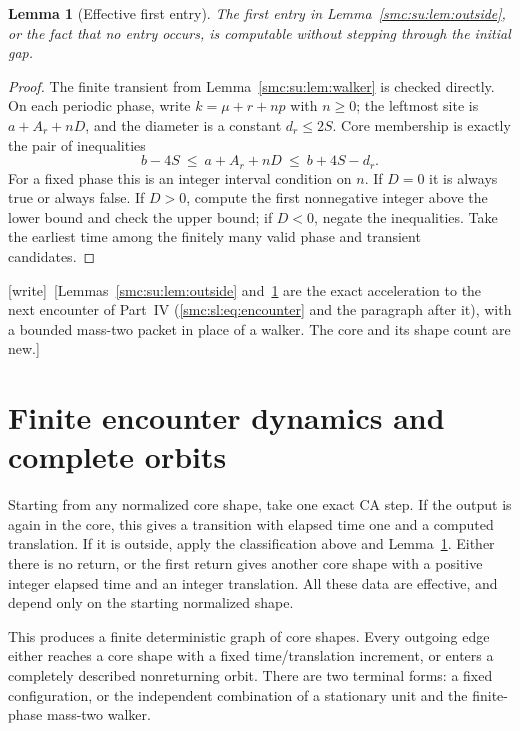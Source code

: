 \documentclass[11pt,letterpaper]{article}
\numberwithin{equation}{section}
\newtheorem{lemma}[theorem]{Lemma}
\theoremstyle{definition}
\theoremstyle{remark}
\newcommand{\wtag}{\textup{[write]}}
\begin{document}
\begin{lemma}[Effective first entry]\label{smc:su:lem:first}
The first entry in Lemma~\ref{smc:su:lem:outside}, or the fact that no entry occurs,
is computable without stepping through the initial gap.
\end{lemma}
\begin{proof}
The finite transient from Lemma~\ref{smc:su:lem:walker} is checked directly. On each
periodic phase, write $k=\mu+r+np$ with $n\ge0$; the leftmost site is
$a+A_r+nD$, and the diameter is a constant $d_r\le2S$. Core membership is
exactly the pair of inequalities
\begin{equation}
 b-4S\ \le\ a+A_r+nD\ \le\ b+4S-d_r.                 \label{smc:su:eq:hit}
\end{equation}
For a fixed phase this is an integer interval condition on $n$. If $D=0$ it is
always true or always false. If $D>0$, compute the first nonnegative integer
above the lower bound and check the upper bound; if $D<0$, negate the
inequalities. Take the earliest time among the finitely many valid phase and
transient candidates.
\end{proof}
\wtag\ [Lemmas~\ref{smc:su:lem:outside} and~\ref{smc:su:lem:first} are the exact acceleration to the next encounter of Part~IV (\eqref{smc:sl:eq:encounter} and the paragraph after it), with a bounded mass-two packet in place of a walker. The core and its shape count are new.]

\section{Finite encounter dynamics and complete orbits}\label{smc:su:sec:orbits}

Starting from any normalized core shape, take one exact CA step. If the output
is again in the core, this gives a transition with elapsed time one and a
computed translation. If it is outside, apply the classification above and
Lemma~\ref{smc:su:lem:first}. Either there is no return, or the first return gives
another core shape with a positive integer elapsed time and an integer
translation. All these data are effective, and depend only on the starting
normalized shape.

This produces a finite deterministic graph of core shapes. Every outgoing
edge either reaches a core shape with a fixed time/translation increment, or
enters a completely described nonreturning orbit. There are two terminal forms:
a fixed configuration, or the independent combination of a stationary unit
and the finite-phase mass-two walker.
\end{document}
